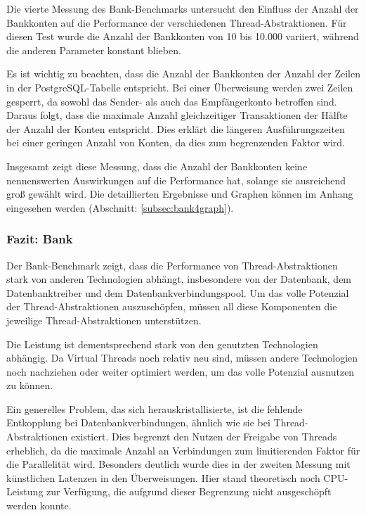 \documentclass[fontsize=12pt,paper=a4,twoside=semi,parskip=half-,headsepline,headinclude]{scrreprt}
\begin{document}
Die vierte Messung des Bank-Benchmarks untersucht den Einfluss der Anzahl der Bankkonten auf die Performance der verschiedenen Thread-Abstraktionen. Für diesen Test wurde die Anzahl der Bankkonten von 10 bis 10.000 variiert, während die anderen Parameter konstant blieben.

Es ist wichtig zu beachten, dass die Anzahl der Bankkonten der Anzahl der Zeilen in der PostgreSQL-Tabelle entspricht. Bei einer Überweisung werden zwei Zeilen gesperrt, da sowohl das Sender- als auch das Empfängerkonto betroffen sind. Daraus folgt, dass die maximale Anzahl gleichzeitiger Transaktionen der Hälfte der Anzahl der Konten entspricht. Dies erklärt die längeren Ausführungszeiten bei einer geringen Anzahl von Konten, da dies zum begrenzenden Faktor wird.

Insgesamt zeigt diese Messung, dass die Anzahl der Bankkonten keine nennenswerten Auswirkungen auf die Performance hat, solange sie ausreichend groß gewählt wird. Die detaillierten Ergebnisse und Graphen können im Anhang eingesehen werden (Abschnitt: \ref{subsec:bank4graph}).

\subsubsection{Fazit: Bank}

Der Bank-Benchmark zeigt, dass die Performance von Thread-Abstraktionen stark von anderen Technologien abhängt, insbesondere von der Datenbank, dem Datenbanktreiber und dem Datenbankverbindungspool. Um das volle Potenzial der Thread-Abstraktionen auszuschöpfen, müssen all diese Komponenten die jeweilige Thread-Abstraktionen unterstützen.

Die Leistung ist dementsprechend stark von den genutzten Technologien abhängig. Da Virtual Threads noch relativ neu sind, müssen andere Technologien noch nachziehen oder weiter optimiert werden, um das volle Potenzial ausnutzen zu können.

Ein generelles Problem, das sich herauskristallisierte, ist die fehlende Entkopplung bei Datenbankverbindungen, ähnlich wie sie bei Thread-Abstraktionen existiert. Dies begrenzt den Nutzen der Freigabe von Threads erheblich, da die maximale Anzahl an Verbindungen zum limitierenden Faktor für die Parallelität wird. Besonders deutlich wurde dies in der zweiten Messung mit künstlichen Latenzen in den Überweisungen. Hier stand theoretisch noch CPU-Leistung zur Verfügung, die aufgrund dieser Begrenzung nicht ausgeschöpft werden konnte.
\end{document}
